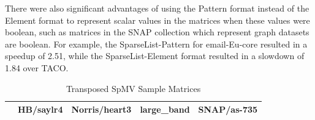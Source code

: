 There were also significant advantages of using the Pattern format instead of the Element format to represent scalar values in the matrices when these values were boolean, such as matrices in the SNAP collection which represent graph datasets are boolean. For example, the SparseList-Pattern for email-Eu-core resulted in a speedup of 2.51, while the SparseList-Element format resulted in a slowdown of 1.84 over TACO.

\begin{table}[htbp]
    \centering
    \footnotesize
    \caption{Transposed SpMV Sample Matrices}
    \label{tab:transposed_spmv_sample_matrices}
    \begin{tabular}{|
        >{\centering\arraybackslash}m{}|
        >{\centering\arraybackslash}m{}|
        >{\centering\arraybackslash}m{}|
        >{\centering\arraybackslash}m{}|
        >{\centering\arraybackslash}m{}|}
        \hline
         & \textbf{HB/saylr4} & \textbf{Norris/heart3} & \textbf{large\_band} & \textbf{SNAP/as-735} \\
        \hline

\end{tabular}
\end{table}
